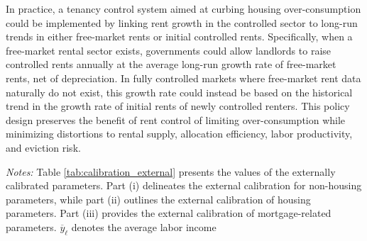 \documentclass[parskip=full]{article}
\newenvironment{fignote2}[1]
{
\par
\medskip
\begin{minipage}{#1}
\footnotesize
}
{
\end{minipage}
}
\begin{document}
In practice, a tenancy control system aimed at curbing housing over-consumption could be implemented by linking rent growth in the controlled sector to long-run trends in either free-market rents or initial controlled rents. Specifically, when a free-market rental sector exists, governments could allow landlords to raise controlled rents annually at the average long-run growth rate of free-market rents, net of depreciation. In fully controlled markets where free-market rent data naturally do not exist, this growth rate could instead be based on the historical trend in the growth rate of initial rents of newly controlled renters. This policy design preserves the benefit of rent control of limiting over-consumption while minimizing distortions to rental supply, allocation efficiency, labor productivity, and eviction risk.




\vspace{1cm}

\begin{table}[H]
    \centering
    \caption{Externally assigned parameter values}
    \vspace{-0.5cm}
    \label{tab:calibration_external}
    
    \vspace{-0.45cm}
    \begin{fignote2}{1.02\textwidth}
    \textit{Notes:} Table \ref{tab:calibration_external} presents the values of the externally calibrated parameters. Part (i) delineates the external calibration for non-housing parameters, while part (ii) outlines the external calibration of housing parameters. Part (iii) provides the external calibration of mortgage-related parameters. $\overline{y}_{\ell}$ denotes the average labor income
    \end{fignote2}
\end{table}
\end{document}
